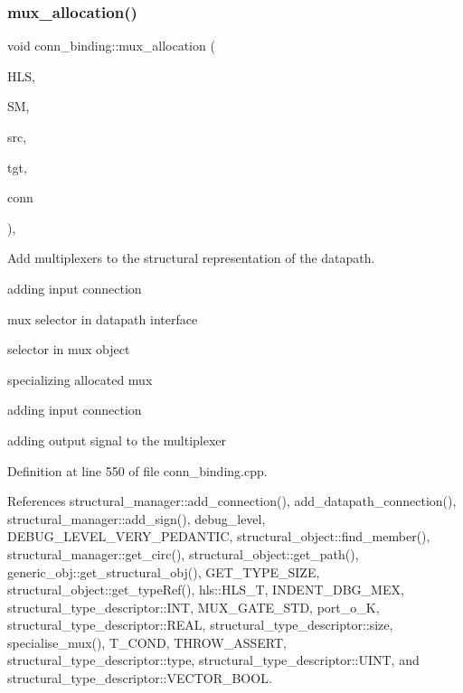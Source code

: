 \subsubsection{\texorpdfstring{mux\+\_\+allocation()}{mux\_allocation()}}
{\footnotesize\ttfamily void conn\+\_\+binding\+::mux\+\_\+allocation (\begin{DoxyParamCaption}\item[{const \hyperlink{hls_8hpp_a75d0c73923d0ddfa28c4843a802c73a7}{hls\+Ref}}]{H\+LS,  }\item[{const \hyperlink{structural__manager_8hpp_ab3136f0e785d8535f8d252a7b53db5b5}{structural\+\_\+manager\+Ref}}]{SM,  }\item[{\hyperlink{structural__objects_8hpp_a8ea5f8cc50ab8f4c31e2751074ff60b2}{structural\+\_\+object\+Ref}}]{src,  }\item[{\hyperlink{structural__objects_8hpp_a8ea5f8cc50ab8f4c31e2751074ff60b2}{structural\+\_\+object\+Ref}}]{tgt,  }\item[{\hyperlink{connection__obj_8hpp_af3c6e389c8543ed97dd9ba412f2c141b}{connection\+\_\+obj\+Ref}}]{conn }\end{DoxyParamCaption})\hspace{0.3cm}{\ttfamily [protected]}, {\ttfamily [virtual]}}



Add multiplexers to the structural representation of the datapath. 

adding input connection

mux selector in datapath interface

selector in mux object

specializing allocated mux

adding input connection

adding output signal to the multiplexer 

Definition at line 550 of file conn\+\_\+binding.\+cpp.



References structural\+\_\+manager\+::add\+\_\+connection(), add\+\_\+datapath\+\_\+connection(), structural\+\_\+manager\+::add\+\_\+sign(), debug\+\_\+level, D\+E\+B\+U\+G\+\_\+\+L\+E\+V\+E\+L\+\_\+\+V\+E\+R\+Y\+\_\+\+P\+E\+D\+A\+N\+T\+IC, structural\+\_\+object\+::find\+\_\+member(), structural\+\_\+manager\+::get\+\_\+circ(), structural\+\_\+object\+::get\+\_\+path(), generic\+\_\+obj\+::get\+\_\+structural\+\_\+obj(), G\+E\+T\+\_\+\+T\+Y\+P\+E\+\_\+\+S\+I\+ZE, structural\+\_\+object\+::get\+\_\+type\+Ref(), hls\+::\+H\+L\+S\+\_\+T, I\+N\+D\+E\+N\+T\+\_\+\+D\+B\+G\+\_\+\+M\+EX, structural\+\_\+type\+\_\+descriptor\+::\+I\+NT, M\+U\+X\+\_\+\+G\+A\+T\+E\+\_\+\+S\+TD, port\+\_\+o\+\_\+K, structural\+\_\+type\+\_\+descriptor\+::\+R\+E\+AL, structural\+\_\+type\+\_\+descriptor\+::size, specialise\+\_\+mux(), T\+\_\+\+C\+O\+ND, T\+H\+R\+O\+W\+\_\+\+A\+S\+S\+E\+RT, structural\+\_\+type\+\_\+descriptor\+::type, structural\+\_\+type\+\_\+descriptor\+::\+U\+I\+NT, and structural\+\_\+type\+\_\+descriptor\+::\+V\+E\+C\+T\+O\+R\+\_\+\+B\+O\+OL.



